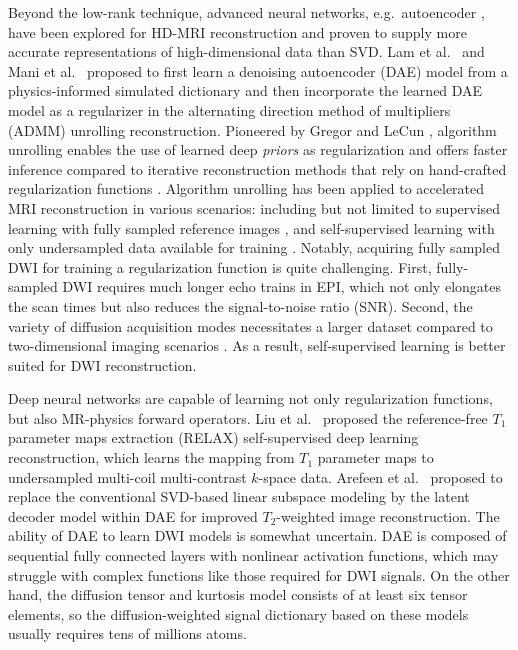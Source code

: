 \documentclass[journal,twoside,web]{ieeecolor}
\begin{document}
	Beyond the low-rank technique,
	advanced neural networks, e.g.~autoencoder \cite{hinton_2006_ae},
	have been explored for HD-MRI reconstruction and
	proven to supply more accurate representations of
	high-dimensional data than SVD.
	Lam et al.~\cite{lam_2019_mrsi} and Mani et al.~\cite{mani_2021_qmodel}
	proposed to first learn a denoising autoencoder (DAE) model
	from a physics-informed simulated dictionary
	and then incorporate the learned DAE model as a regularizer
	in the alternating direction method of multipliers (ADMM)
	\cite{boyd_2010_admm}
	unrolling reconstruction.
	Pioneered by Gregor and LeCun \cite{gregor_2010_algunroll},
	algorithm unrolling enables the use of learned deep \textit{priors}
	as regularization and offers faster inference compared to
	iterative reconstruction methods that rely on hand-crafted regularization functions
	\cite{monga_2021_algunroll}.
	Algorithm unrolling has been applied to
	accelerated MRI reconstruction in various scenarios:
	including but not limited to
	supervised learning with fully sampled reference images
	\cite{yang_2018_admmnet,hammernik_2018_varnet,aggarwal_2018_modl},
	and self-supervised learning
	with only undersampled data available for training
	\cite{yaman_2020_ssdu,yaman_2022_zs}.
	Notably, acquiring fully sampled DWI
	for training a regularization function is quite challenging.
	First, fully-sampled DWI requires much longer echo trains in EPI,
	which not only elongates the scan times
	but also reduces the signal-to-noise ratio (SNR).
	Second, the variety of diffusion acquisition modes necessitates
	a larger dataset compared to two-dimensional imaging scenarios
	\cite{knoll_2020_fastmri}.
	As a result, self-supervised learning is better suited
	for DWI reconstruction.

	Deep neural networks are capable of learning
	not only regularization functions,
	but also MR-physics forward operators.
	Liu et al.~\cite{liu_2021_relax} proposed
	the reference-free $T_1$ parameter maps extraction (RELAX)
	self-supervised deep learning reconstruction,
	which learns the mapping from $T_1$ parameter maps to
	undersampled multi-coil multi-contrast $k$-space data.
	Arefeen et al.~\cite{arefeen_2023_latent} proposed
	to replace the conventional SVD-based linear subspace modeling
	\cite{huang_2012_t2basis}
	by the latent decoder model within DAE
	for improved $T_2$-weighted image reconstruction.
	The ability of DAE to learn DWI models is somewhat uncertain.
	DAE is composed of sequential fully connected layers
	with nonlinear activation functions,
	which may struggle with complex functions like those required for DWI signals.
	On the other hand, 
	the diffusion tensor and kurtosis model \cite{basser_1994_dmri}
	consists of at least six tensor elements,
	so the diffusion-weighted signal dictionary 
	based on these models
	usually requires tens of millions atoms.
\end{document}
